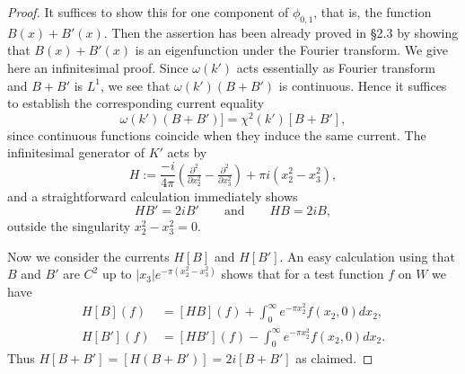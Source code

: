 \begin{proof}
It suffices to show this for one component of $\phi_{0,1}$, that
is, the function $B(x)+B'(x)$. Then the assertion has been already
proved in \S 2.3 by showing that $B(x)+B'(x)$ is an eigenfunction
under the Fourier transform. We give here an infinitesimal proof.
Since $\omega(k')$ acts essentially as Fourier transform and $B+B'$
is $L^1$, we see that $\omega(k')(B+B')$ is continuous. Hence it
suffices to establish the corresponding current equality
\[\omega(k')(B+B')] = \chi^2(k')[B+B'],\] since continuous functions
coincide when they induce the same current. The infinitesimal
generator of $K'$ acts by 
\[H:=\frac{-i}{4\pi} \left(\tfrac{\partial^2}{\partial{x_2^2}} - \tfrac{\partial^2}{\partial{x_3^2}}\right) + \pi i (x_2^2-x_3^2),\]
and a straightforward calculation immediately shows
\[
H B' = 2i B' \qquad \text{and} \qquad  H {B} = 2i {B},
\]
outside the singularity $x_2^2-x_3^2=0$. 
\begin{comment}
For $B$, we have
\[
B(x) =- \frac{1}{2 \sqrt{2} \pi} e^{-\pi(x_2^2+ x_3^2)} + \frac{1}{2  \sqrt{\pi}}|x_3| \Gamma(\tfrac12,2 \pi x_3^2) e^{ -\pi(x_2^2- x_3^2)},
\]
and we denote the second summand by $\tilde{B}(x)$. One easily sees that the first summand is annihilated by 
$\frac{-i}{4\pi} \square + \pi i r^2$. For $\tilde{B}(x)$, we first see 
\[
\frac{\partial}{\partial x_3} \tilde{B}(x) = \frac{1}{x_3} \tilde{B}(x) -\sqrt{2}x_3  e^{-\pi(x_2^2+ x_3^2)}.
+ 2\pi x_3 \tilde{B}(x),
\]
again away from the singularity $x_3=0$. Indeed, this follows easily from $\frac{\partial}{\partial x_3}  \Gamma(\tfrac12,2 \pi x_3^2) = - 2 \sqrt{2\pi} \sgn(x_3) e^{-2 \pi x_3^2}$. A little calculation then gives
\begin{align*}
\frac{\partial^2}{\partial x_3^2} \tilde{B}(x) = 6 \pi \tilde{B}(x) - 2\sqrt{2} e^{ -\pi(x_2^2+x_3^2)} +(2\pi)^2 x_3^2 \tilde{B}(x).
\end{align*}
Then 
\[
\frac{-i}{4\pi} \square \tilde{B}(x) = -\pi i r^2 \tilde{B}(x) + 2i \tilde{B}(x) - 2i \frac{1}{2\sqrt{2}\pi} e^{ -\pi(x_2^2+x_3^2)}.
\]
In conclusion, 
\[
H {B}(x) = 2i {B}(x),
\]
again, outside the singularity. 
\end{comment}
Now we consider the currents $H[B]$ and $H[B']$. An easy calculation
using that $B$ and $B'$ are $C^2$ up to $|x_3|e^{-\pi(x_2^2-x_3^2)}$
shows that for a test function $f$ on $W$ we have
\begin{align*}
H[B](f) &= [HB](f) + \int_{0}^{\infty} e^{-\pi x_2^2} f(x_2,0)dx_2, \\
H[B'](f) &= [HB'](f) - \int_{0}^{\infty} e^{-\pi x_2^2} f(x_2,0) dx_2.
\end{align*}
Thus $H[B+B'] = [H(B+B')]= 2i[B+B']$ as claimed.
\end{proof}
